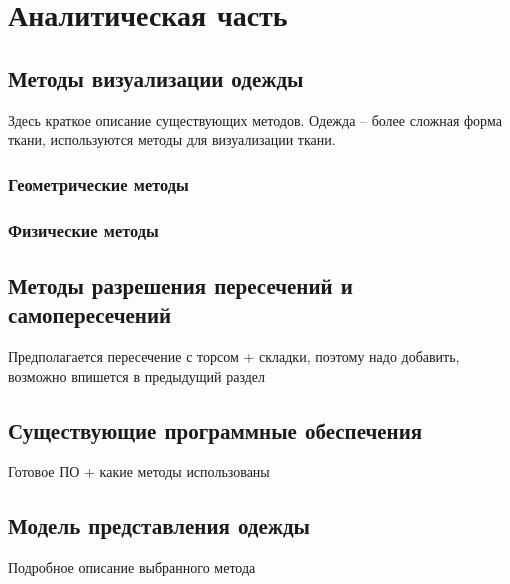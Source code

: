 \chapter{Аналитическая часть}

\section{Методы визуализации одежды}

Здесь краткое описание существующих методов.
Одежда -- более сложная форма ткани, используются
методы для визуализации ткани.

\subsection{Геометрические методы}
\subsection{Физические методы}

\section{Методы разрешения пересечений и самопересечений}

Предполагается пересечение с торсом + складки, поэтому надо добавить, возможно впишется в предыдущий раздел

\section{Существующие программные обеспечения}

Готовое ПО + какие методы использованы

\section{Модель представления одежды}

Подробное описание выбранного метода
